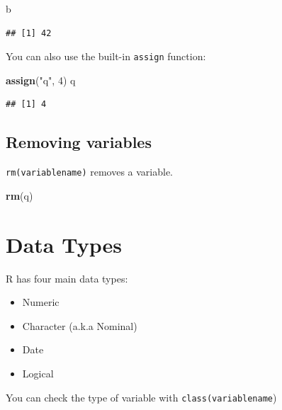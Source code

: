 \documentclass[]{book}
\newenvironment{Shaded}{\begin{snugshade}}{\end{snugshade}}
\newcommand{\DecValTok}[1]{\textcolor[rgb]{0.00,0.00,0.81}{#1}}
\newcommand{\KeywordTok}[1]{\textcolor[rgb]{0.13,0.29,0.53}{\textbf{#1}}}
\newcommand{\NormalTok}[1]{#1}
\newcommand{\StringTok}[1]{\textcolor[rgb]{0.31,0.60,0.02}{#1}}
\providecommand{\tightlist}{%
  \setlength{\itemsep}{0pt}\setlength{\parskip}{0pt}}
\theoremstyle{definition}
\theoremstyle{definition}
\theoremstyle{definition}
\theoremstyle{remark}
\begin{document}
\begin{Shaded}
\begin{Highlighting}[]
\NormalTok{b}
\end{Highlighting}
\end{Shaded}

\begin{verbatim}
## [1] 42
\end{verbatim}

You can also use the built-in \texttt{assign} function:

\begin{Shaded}
\begin{Highlighting}[]
\KeywordTok{assign}\NormalTok{(}\StringTok{"q"}\NormalTok{, }\DecValTok{4}\NormalTok{)}
\NormalTok{q}
\end{Highlighting}
\end{Shaded}

\begin{verbatim}
## [1] 4
\end{verbatim}

\hypertarget{removing-variables}{%
\subsection{Removing variables}\label{removing-variables}}

\texttt{rm(variablename)} removes a variable.

\begin{Shaded}
\begin{Highlighting}[]
\KeywordTok{rm}\NormalTok{(q)}
\end{Highlighting}
\end{Shaded}

\hypertarget{data-types}{%
\section{Data Types}\label{data-types}}

R has four main data types:

\begin{itemize}
\tightlist
\item
  Numeric
\item
  Character (a.k.a Nominal)
\item
  Date
\item
  Logical
\end{itemize}

You can check the type of variable with \texttt{class(variablename})
\end{document}
